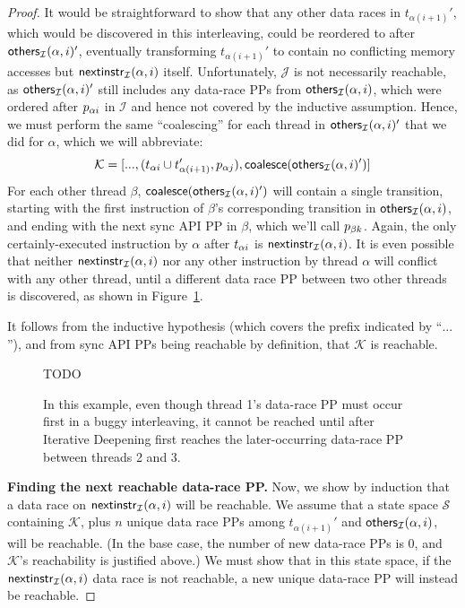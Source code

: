 \begin{proof}
It would be straightforward to show that any other data races in $t_{\alpha{}(i+1)}'$, which would be discovered in this interleaving,
could be reordered to after $\mathsf{others}_{\mathcal{I}}(\alpha,i)'$,
eventually transforming $t_{\alpha{}(i+1)}'$ to contain no conflicting memory accesses but $\mathsf{nextinstr}_{\mathcal{I}}(\alpha,i)$ itself.
Unfortunately, $\mathcal{J}$ is not necessarily reachable, as $\mathsf{others}_{\mathcal{I}}(\alpha,i)'$ still includes any data-race PPs from $\mathsf{others}_{\mathcal{I}}(\alpha,i)$,
which were ordered after $p_{\alpha{}i}$ in $\mathcal{I}$ and hence not covered by the inductive assumption.
Hence, we must perform the same ``coalescing'' for each thread in $\mathsf{others}_{\mathcal{I}}(\alpha,i)'$ that we did for $\alpha$,
which we will abbreviate:
\[
	\mathcal{K} = [..., (t_{\alpha{}i} \cup t_{\alpha{}(i+1)}', p_{\alpha{}j}), \mathsf{coalesce}(\mathsf{others}_{\mathcal{I}}(\alpha,i)') ]
\]
For each other thread $\beta$, $\mathsf{coalesce}(\mathsf{others}_{\mathcal{I}}(\alpha,i)')$ will contain a single transition,
starting with the first instruction of $\beta$'s corresponding transition in $\mathsf{others}_{\mathcal{I}}(\alpha,i)$,
and ending with the next sync API PP in $\beta$, which we'll call $p_{\beta{}k}$.
Again, the only certainly-executed instruction by $\alpha$ after $t_{\alpha{}i}$ is $\mathsf{nextinstr}_{\mathcal{I}}(\alpha,i)$.
It is even possible that neither $\mathsf{nextinstr}_{\mathcal{I}}(\alpha,i)$ nor any other instruction by thread $\alpha$ will conflict with any other thread,
until a different data race PP between two other threads is discovered,
as shown in Figure~\ref{fig:threethreads}.

It follows from the inductive hypothesis (which covers the prefix indicated by ``$...$''),
and from sync API PPs being reachable by definition,
that $\mathcal{K}$ is reachable.

\begin{figure}[t]
	TODO %
	\caption{In this example, even though thread 1's data-race PP must occur first in a buggy interleaving, it cannot be reached until after Iterative Deepening first reaches the later-occurring data-race PP between threads 2 and 3.}
	\label{fig:threethreads}
\end{figure}

\newcommand\tbk{\ensuremath{t_{\beta{}k}}}
\newcommand\tbka{\ensuremath{t_{\beta{}k1}}}
\newcommand\tbkb{\ensuremath{t_{\beta{}k2}}}
\newcommand\tgl{\ensuremath{t_{\gamma{}l}}}

{\bf Finding the next reachable data-race PP.}
Now, we show by induction that a data race on $\mathsf{nextinstr}_{\mathcal{I}}(\alpha,i)$ will be reachable.
We assume that a state space $\mathcal{S}$ containing $\mathcal{K}$,
plus $n$ unique data race PPs among $t_{\alpha{}(i+1)}'$ and $\mathsf{others}_{\mathcal{I}}(\alpha,i)$,
will be reachable.
(In the base case, the number of new data-race PPs is 0, and $\mathcal{K}$'s reachability is justified above.)
We must show that in this state space, if the $\mathsf{nextinstr}_{\mathcal{I}}(\alpha,i)$ data race is not reachable,
a new unique data-race PP will instead be reachable.


\end{proof}

